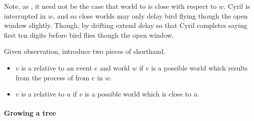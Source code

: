 \begin{note}
  Note, as \drifting{}, it need not be the case that world  to is close with respect to \(w\).
  Cyril is interrupted in \(w\), and so close worlds may only delay bird flying though the open window slightly.
  Though, by drifting extend delay so that Cyril completes saying first ten digits before bird flies though the open window.

  Given observation, introduce two pieces of shorthand.
  \begin{itemize}
  \item
    \(v\) is a \emph{\driftW{}} relative to an event \(e\) and world \(w\) if \(v\) is a possible world which results from the process of \drifting{} from \(e\) in \(w\).
  \item
    \(v\) is a \emph{\closeW{}} relative to \(u\) if \(v\) is a possible world which is close to \(u\).
  \end{itemize}
\end{note}

\paragraph{Growing a tree}
\label{cha:fcs:sec:Prog:L:Alg:branches:tree}

